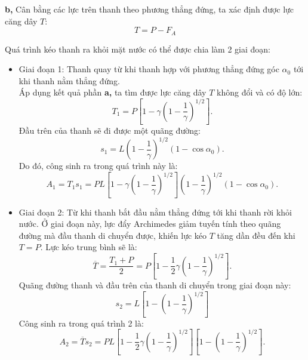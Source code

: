 \textbf{b,} Cân bằng các lực trên thanh theo phương thẳng đứng, ta xác định được lực căng dây $T$:
    \begin{equation}
        T = P - F_A \nonumber
    \end{equation}

Quá trình kéo thanh ra khỏi mặt nước có thể được chia làm 2 giai đoạn:
\begin{itemize}
    \item Giai đoạn 1: Thanh quay từ khi thanh hợp với phương thẳng đứng góc $\alpha_0$ tới khi thanh nằm thẳng đứng. \\
    Áp dụng kết quả phần \textbf{a,} ta tìm được lực căng dây $T$ không đổi và có độ lớn:
    \begin{equation}
        T_1 = P \left[ 1 - \gamma \left( 1 - \dfrac{1}{\gamma} \right)^{1/2} \right]. \nonumber
    \end{equation} 
    Đầu trên của thanh sẽ đi được một quãng đường:
    \begin{equation}
        s_1 = L \left( 1 - \dfrac{1}{\gamma} \right)^{1/2} \left( 1 - \cos \alpha_0\right). \nonumber
    \end{equation}
    Do đó, công sinh ra trong quá trình này là:
    \begin{equation}
        A_1 = T_1 s_1 = P L \left[ 1 - \gamma \left( 1 - \dfrac{1}{\gamma} \right)^{1/2} \right] \left( 1 - \dfrac{1}{\gamma} \right)^{1/2} \left( 1 - \cos \alpha_0 \right). \nonumber
    \end{equation}
    \item Giai đoạn 2: Từ khi thanh bắt đầu nằm thẳng đứng tới khi thanh rời khỏi nước.
    Ở giai đoạn này, lực đẩy Archimedes giảm tuyến tính theo quãng đường mà đầu thanh di chuyển được, khiến lực kéo $T$ tăng dần đều đến khi $T=P$. Lực kéo trung bình sẽ là:
    \begin{equation}
        \overline{T} = \dfrac{T_1+P}{2} = P \left[ 1 - \dfrac{1}{2} \gamma \left( 1 - \dfrac{1}{\gamma} \right)^{1/2} \right]. \nonumber
    \end{equation}
    Quãng đường thanh và đầu trên của thanh di chuyển trong giai đoạn này:
    \begin{equation}
        s_2 = L \left[ 1 - \left( 1 - \dfrac{1}{\gamma} \right)^{1/2} \right] \nonumber
    \end{equation}
    Công sinh ra trong quá trình 2 là:
    \begin{equation}
        A_2 = \overline{T} s_2 = P L \left[ 1 - \dfrac{1}{2} \gamma \left( 1 - \dfrac{1}{\gamma} \right)^{1/2} \right] \left[ 1 - \left( 1 - \dfrac{1}{\gamma} \right)^{1/2} \right]. \nonumber
    \end{equation}
\end{itemize}
